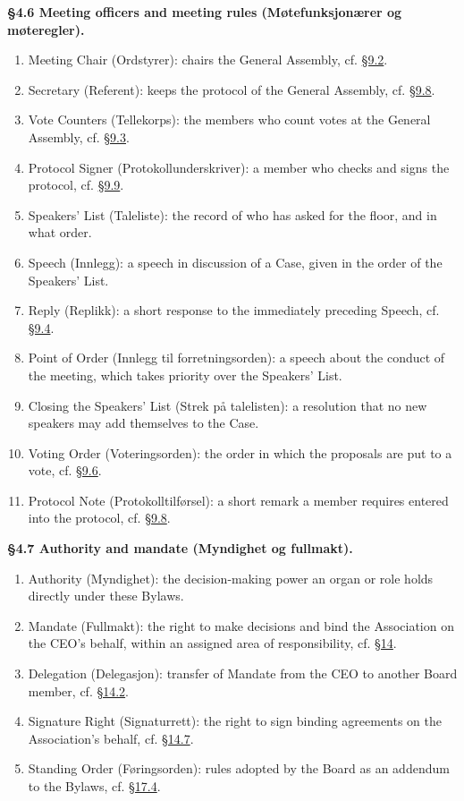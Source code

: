 \documentclass{../../../Common/Latex/Templates/rapport}
\begin{document}
\textbf{\S 4.6 Meeting officers and meeting rules (Møtefunksjonærer og møteregler).}\label{bylaw:4.6}
\begin{enumerate}
  \item Meeting Chair (Ordstyrer): chairs the General Assembly, cf. \hyperref[bylaw:9.2]{\S 9.2}.
  \item Secretary (Referent): keeps the protocol of the General Assembly, cf. \hyperref[bylaw:9.8]{\S 9.8}.
  \item Vote Counters (Tellekorps): the members who count votes at the General Assembly, cf. \hyperref[bylaw:9.3]{\S 9.3}.
  \item Protocol Signer (Protokollunderskriver): a member who checks and signs the protocol, cf. \hyperref[bylaw:9.9]{\S 9.9}.
  \item Speakers' List (Taleliste): the record of who has asked for the floor, and in what order.
  \item Speech (Innlegg): a speech in discussion of a Case, given in the order of the Speakers' List.
  \item Reply (Replikk): a short response to the immediately preceding Speech, cf. \hyperref[bylaw:9.4]{\S 9.4}.
  \item Point of Order (Innlegg til forretningsorden): a speech about the conduct of the meeting, which takes priority over the Speakers' List.
  \item Closing the Speakers' List (Strek på talelisten): a resolution that no new speakers may add themselves to the Case.
  \item Voting Order (Voteringsorden): the order in which the proposals are put to a vote, cf. \hyperref[bylaw:9.6]{\S 9.6}.
  \item Protocol Note (Protokolltilførsel): a short remark a member requires entered into the protocol, cf. \hyperref[bylaw:9.8]{\S 9.8}.
\end{enumerate}

\textbf{\S 4.7 Authority and mandate (Myndighet og fullmakt).}\label{bylaw:4.7}
\begin{enumerate}
  \item Authority (Myndighet): the decision-making power an organ or role holds directly under these Bylaws.
  \item Mandate (Fullmakt): the right to make decisions and bind the Association on the CEO's behalf, within an assigned area of responsibility, cf. \hyperref[bylaw:14]{\S 14}.
  \item Delegation (Delegasjon): transfer of Mandate from the CEO to another Board member, cf. \hyperref[bylaw:14.2]{\S 14.2}.
  \item Signature Right (Signaturrett): the right to sign binding agreements on the Association's behalf, cf. \hyperref[bylaw:14.7]{\S 14.7}.
  \item Standing Order (Føringsorden): rules adopted by the Board as an addendum to the Bylaws, cf. \hyperref[bylaw:17.4]{\S 17.4}.
\end{enumerate}
\end{document}
